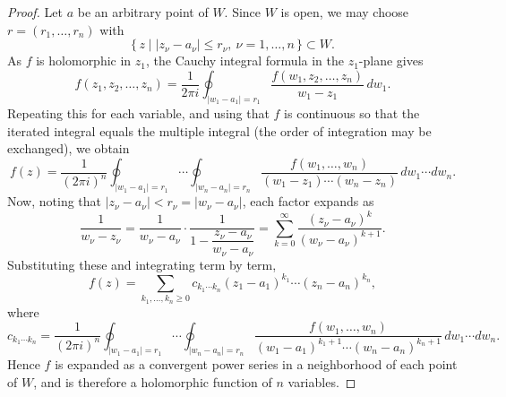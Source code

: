 \begin{proof}
Let $a$ be an arbitrary point of $W$. Since $W$ is open, we may choose
$r = (r_1, \dots, r_n)$ with
\[
  \{\, z \mid |z_\nu - a_\nu| \le r_\nu,\ \nu = 1, \dots, n \,\} \subset W .
\]
As $f$ is holomorphic in $z_1$, the Cauchy integral formula in the $z_1$-plane
gives
\[
  f(z_1, z_2, \dots, z_n)
  = \frac{1}{2\pi i} \oint_{|w_1 - a_1| = r_1}
      \frac{f(w_1, z_2, \dots, z_n)}{w_1 - z_1}\, dw_1 .
\]
Repeating this for each variable, and using that $f$ is continuous so that the
iterated integral equals the multiple integral (the order of integration may be
exchanged), we obtain
\[
  f(z) = \frac{1}{(2\pi i)^n}
    \oint_{|w_1 - a_1| = r_1} \!\!\!\! \cdots \oint_{|w_n - a_n| = r_n}
    \frac{f(w_1, \dots, w_n)}{(w_1 - z_1) \cdots (w_n - z_n)}\, dw_1 \cdots dw_n .
\]
Now, noting that $|z_\nu - a_\nu| < r_\nu = |w_\nu - a_\nu|$, each factor expands
as
\[
  \frac{1}{w_\nu - z_\nu}
  = \frac{1}{w_\nu - a_\nu} \cdot
    \frac{1}{1 - \dfrac{z_\nu - a_\nu}{w_\nu - a_\nu}}
  = \sum_{k=0}^\infty \frac{(z_\nu - a_\nu)^k}{(w_\nu - a_\nu)^{k+1}} .
\]
Substituting these and integrating term by term,
\[
  f(z) = \sum_{k_1, \dots, k_n \ge 0}
    c_{k_1 \cdots k_n} (z_1 - a_1)^{k_1} \cdots (z_n - a_n)^{k_n},
\]
where
\[
  c_{k_1 \cdots k_n} = \frac{1}{(2\pi i)^n}
    \oint_{|w_1 - a_1| = r_1} \!\!\!\! \cdots \oint_{|w_n - a_n| = r_n}
    \frac{f(w_1, \dots, w_n)}
         {(w_1 - a_1)^{k_1 + 1} \cdots (w_n - a_n)^{k_n + 1}}\, dw_1 \cdots dw_n .
\]
Hence $f$ is expanded as a convergent power series in a neighborhood of each
point of $W$, and is therefore a holomorphic function of $n$ variables.
\end{proof}
